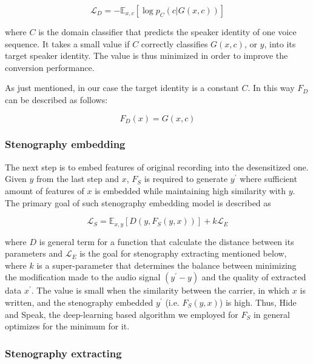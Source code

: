 \documentclass[journal]{IEEEtran} %
\begin{document}
\begin{equation}
    \label{eqn:dom_loss}
    \mathcal{L}_D = - \mathbb{E}_{x, c}[\log p_C(c | G(x, c))]
\end{equation}

where $C$ is the domain classifier that predicts the speaker identity of one voice sequence. It takes a small value if $C$ correctly classifies $G(x, c)$, or $y$, into its target speaker identity. The value is thus minimized in order to improve the conversion performance.

As just mentioned, in our case the target identity is a constant $C$. In this way $F_D$ can be described as follows:

\begin{equation}
    \label{eqn:fd_val}
    F_D(x) = G(x, c)
\end{equation}

\subsubsection{Stenography embedding}

The next step is to embed features of original recording into the desensitized one. Given $y$ from the last step and $x$, $F_S$ is required to generate $y^{\prime}$ where sufficient amount of features of $x$ is embedded while maintaining high similarity with $y$. The primary goal of such stenography embedding model is described as

\begin{equation}
    \label{eqn:embed_loss}
    \mathcal{L}_S = \mathbb{E}_{x, y}[D(y, F_S(y, x))] + k\mathcal{L}_E
\end{equation}

where $D$ is general term for a function that calculate the distance between its parameters and $\mathcal{L}_E$ is the goal for stenography extracting mentioned below, where $k$ is a super-parameter that determines the balance between minimizing the modification made to the audio signal $(y^{\prime} - y)$ and the quality of extracted data $x^{\prime}$. The value is small when the similarity between the carrier, in which $x$ is written, and the stenography embedded $y^{\prime}$ (i.e. $F_S(y, x)$) is high. Thus, Hide and Speak, the deep-learning based algorithm we employed for $F_S$ in general optimizes for the minimum for it.

\subsubsection{Stenography extracting}
\end{document}
